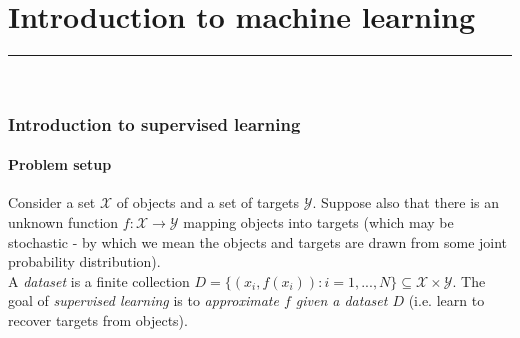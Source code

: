 \newpage
\part{Introduction to machine learning}
\hrule
\noindent \\
\section{Introduction to supervised learning}

\subsection{Problem setup}

\begin{framedef}
Consider a set $\mathcal{X}$ of objects and a set of targets $\mathcal{Y}$. Suppose also that there is an unknown function $f : \mathcal{X} \rightarrow \mathcal{Y}$ mapping objects into targets (which may be stochastic - by which we mean the objects and targets are drawn from some joint probability distribution).\\

A \textit{dataset} is a finite collection $D = \{(x_i,f(x_i)) : i=1,...,N\} \subseteq \mathcal{X} \times \mathcal{Y}$. The goal of \textit{supervised learning} is to \textit{approximate $f$ given a dataset $D$} (i.e. learn to recover targets from objects). 
\end{framedef}

